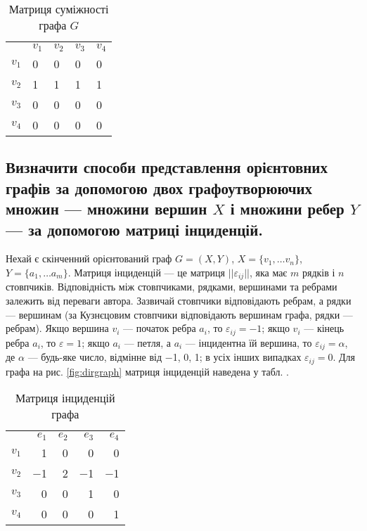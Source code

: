 \documentclass[a4paper,oneside,DIV=12,fontsize=12pt, headings=small]{scrartcl}
\begin{document}
			\begin{table}[h!]
				\centering
				
				\begin{tabular}{lllll}
					\toprule
						      & $v_1$ & $v_2$ & $v_3$ & $v_4$ \\
						$v_1$ & 0     & 0     & 0     & 0     \\
						$v_2$ & 1     & 1     & 1     & 1     \\
						$v_3$ & 0     & 0     & 0     & 0     \\
						$v_4$ & 0     & 0     & 0     & 0     \\
					\bottomrule
				\end{tabular}
				
				\caption{Матриця суміжності графа $G$}
				\label{tab:dirgadjmatrix}
			\end{table}
		
		\subsection{Визначити способи представлення орієнтовних графів за допомогою двох графоутворюючих множин --- множини вершин $X$ і множини ребер $Y$ --- за допомогою матриці інциденцій.}
			Нехай є скінченний орієнтований граф $G = (X, Y)$, $X = \{v_1, \dots v_n\}$, $Y = \{a_1, \dots a_m\}$. Матриця інциденцій --- це матриця $||\varepsilon_{ij}||$, яка має $m$ рядків і $n$ стовпчиків. Відповідність між стовпчиками, рядками, вершинами та ребрами залежить від переваги автора. Зазвичай стовпчики відповідають ребрам, а рядки --- вершинам (за Кузнєцовим стовпчики відповідають вершинам графа, рядки --- ребрам). Якщо вершина $v_i$ --- початок ребра $a_i$, то $\varepsilon_{ij} = -1$; якщо $v_i$ --- кінець ребра $a_i$, то $\varepsilon = 1$; якщо $a_i$ --- петля, а $a_i$ --- інцидентна їй вершина, то $\varepsilon_{ij} = \alpha$, де $\alpha$ --- будь-яке число, відмінне від −1, 0, 1; в усіх інших випадках $\varepsilon_{ij} = 0$.
			Для графа на рис. \ref{fig:dirgraph} матриця інциденцій наведена у табл. .
			
			\begin{table}[h!]
				\centering
				
				\begin{tabular}{*{5}{r}}
					\toprule
						      & $e_1$ & $e_2$ & $e_3$ & $e_4$ \\
						$v_1$ & 1     & 0     & 0     & 0     \\
						$v_2$ & −1    & 2     & −1    & −1    \\
						$v_3$ & 0     & 0     & 1     & 0     \\
						$v_4$ & 0     & 0     & 0     & 1     \\
					\bottomrule
				\end{tabular}
				
				\caption{Матриця інциденцій графа}
			\end{table}
		
\end{document}
